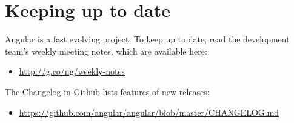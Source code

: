 \section{Keeping up to date}

Angular is a fast evolving project. To keep up to date,  read the development team’s
weekly meeting notes, which are available here:

\begin{itemize}
  \item \url{http://g.co/ng/weekly-notes}
\end{itemize}

The Changelog in Github lists features of new releases:

\begin{itemize}
  \item \url{https://github.com/angular/angular/blob/master/CHANGELOG.md}
\end{itemize}
